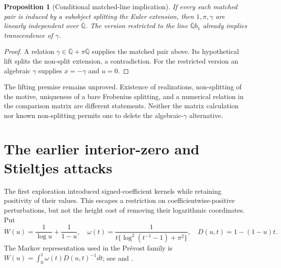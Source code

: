 \documentclass[11pt,a4paper]{article}
\newcommand{\Qbar}{\overline{\mathbb Q}}
\newtheorem{proposition}[theorem]{Proposition}
\theoremstyle{definition}
\theoremstyle{remark}
\numberwithin{equation}{section}
\begin{document}
\begin{proposition}[Conditional matched-line implication]\label{fd:prop:matched}
If every such matched pair is induced by a subobject splitting the
Euler extension, then $1,\pi,\gamma$ are linearly independent over
$\Qbar$.  The version restricted to the line $\Qbar b_1$ already implies
transcendence of $\gamma$.
\end{proposition}
\begin{proof}
A relation $\gamma\in\Qbar+\pi\Qbar$ supplies the matched pair above.
Its hypothetical lift splits the non-split extension, a contradiction.
For the restricted version an algebraic $\gamma$ supplies $x=-\gamma$
and $u=0$.
\end{proof}

The lifting premise remains unproved.  Existence of realizations,
non-splitting of the motive, uniqueness of a bare Frobenius splitting,
and a numerical relation in the comparison matrix are different
statements.  Neither the matrix calculation nor known non-splitting
permits one to delete the algebraic-$\gamma$ alternative.

\section{The earlier interior-zero and Stieltjes attacks}
\label{fd:sec:early}

The first exploration \cite{fd:early} introduced signed-coefficient
kernels while retaining positivity of their values.  This escapes a
restriction on coefficientwise-positive perturbations, but not the
height cost of removing their logarithmic coordinates.
Put
\[
 W(u)=\frac1{\log u}+\frac1{1-u},\quad
 \omega(t)=\frac1{t\{\log^2(t^{-1}-1)+\pi^2\}},\quad
 D(u,t)=1-(1-u)t.
\]
The Markov representation used in the Pr\'evost family is
$W(u)=\int_0^1\omega(t)D(u,t)^{-1}dt$; see \cite{fd:Prevost} and
\cite[``Fixed-prime Rodrigues twists'']{pm:KEIO002}.
\end{document}
